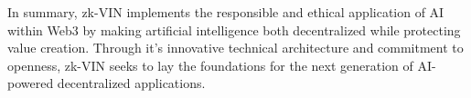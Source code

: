 \documentclass[conference]{IEEEtran}
\begin{document}
In summary, zk-VIN implements the responsible and ethical application of AI within Web3 by making artiﬁcial intelligence both decentralized while protecting value creation. Through it’s innovative technical architecture and commitment to openness, zk-VIN seeks to lay the foundations for the next generation of AI-powered decentralized applications.



\clearpage







\end{document}
